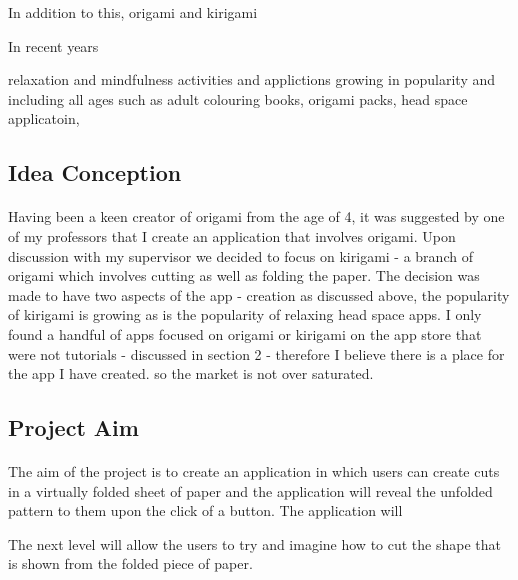 \documentclass[11pt]{article}
\begin{document}
                In addition to this,  origami and kirigami 
            
            
    
                In recent years
            
                relaxation and mindfulness activities and applictions growing in popularity and including all ages such as adult colouring books, origami packs, head space applicatoin, 
                
        
        \subsection{Idea Conception}
            
                    \paragraph{} 
                        Having been a keen creator of origami from the age of 4, it was suggested by one of my professors that I create an application that involves origami. Upon discussion with my supervisor we decided to focus on kirigami - a branch of origami which involves cutting as well as folding the paper. The decision was made to have two aspects of the app - creation 
                        as discussed above, the popularity of kirigami is growing as is the popularity of relaxing head space apps. I only found a handful of apps focused on origami or kirigami on the app store that were not tutorials - discussed in section 2 - therefore I believe there is a place for the app I have created. so the market is not over saturated. 
        
                \subsection{Project Aim}
            
                 \paragraph{} 
                 The aim of the project is to create an application in which users can create cuts in a virtually folded sheet of paper and the application will reveal the unfolded pattern to them upon the click of a button. The application will 
                 
                 
                 The next level will allow the users to try and imagine how to cut the shape that is shown from the folded piece of paper.
\end{document}
